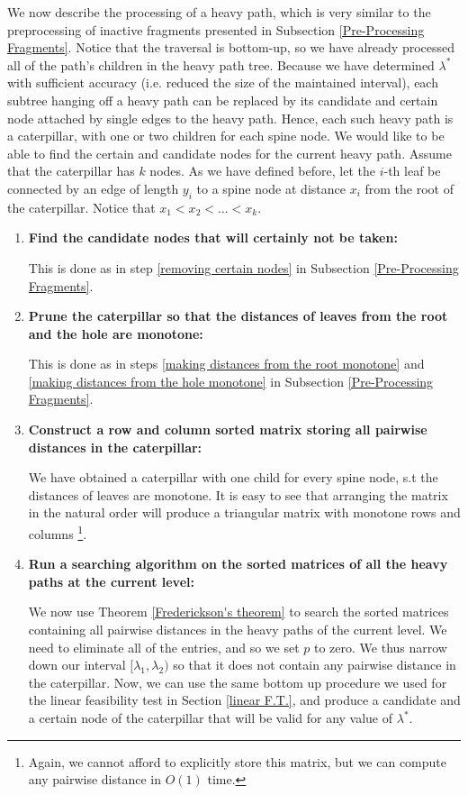 \documentclass[11pt,a4paper]{article}
\theoremstyle{definition}
\theoremstyle{remark}
\begin{document}
We now describe the processing of a heavy path, which is very similar to the preprocessing of inactive fragments presented in Subsection \ref{Pre-Processing Fragments}. Notice that the traversal is bottom-up, so we have already processed all of the path's children in the heavy path tree. Because we have determined $\lambda^*$ with sufficient accuracy (i.e. reduced the size of the maintained interval), each subtree hanging off a heavy path can be replaced by its candidate and certain node attached by single edges to the heavy path. Hence, each such heavy path is a caterpillar, with one or two children for each spine node. We would like to be able to find the certain and candidate nodes for the current heavy path. %
Assume that the caterpillar has $k$ nodes. As we have defined before, let the $i$-th leaf be connected by an edge of length $y_i$ to a spine node at distance $x_i$ from the root of the caterpillar. Notice that $x_1 < x_2 < \ldots < x_k$.
\begin{enumerate}
\item\textbf{Find the candidate nodes that will certainly not be taken:}

This is done as in step \ref{removing certain nodes} in Subsection \ref{Pre-Processing Fragments}.
\item\textbf{Prune the caterpillar so that the distances of leaves from the root and the hole are monotone:}	

This is done as in steps \ref{making distances from the root monotone} and \ref{making distances from the hole monotone} in Subsection \ref{Pre-Processing Fragments}.
\item\textbf{Construct a row and column sorted matrix storing all pairwise distances in the caterpillar:}

We have obtained a caterpillar with one child for every spine node, s.t the distances of leaves are monotone. It is easy to see that arranging the matrix in the natural order will produce a triangular matrix with monotone rows and columns \footnote{Again, we cannot afford to explicitly store this matrix, but we can compute any pairwise distance in $O(1)$ time.}.
\item\textbf{Run a searching algorithm on the sorted matrices of all the heavy paths at the current level:}

We now use Theorem \ref{Frederickson's theorem} to search the sorted matrices containing all pairwise distances in the heavy paths of the current level. We need to eliminate all of the entries, and so we set $p$ to zero. We thus narrow down our interval $[\lambda_1,\lambda_2)$ so that it does not contain any pairwise distance in the caterpillar. Now, we can use the same bottom up procedure we used for the linear feasibility test in Section \ref{linear F.T.}, and produce a candidate and a certain node of the caterpillar that will be valid for any value of $\lambda^*$.
\end{enumerate}
\end{document}
